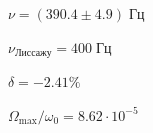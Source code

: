\noindent $\nu=(390.4\pm4.9)\;\text{Гц}$\par\vspace{3mm}
\noindent $\nu_{\text{Лиссажу}}=400\;\text{Гц}$\par\vspace{3mm}
\noindent $\delta=-2.41\%$\par\vspace{3mm}
\noindent $\Omega_{\max}/\omega_0=8.62\cdot10^{-5}$\par\vspace{3mm}
